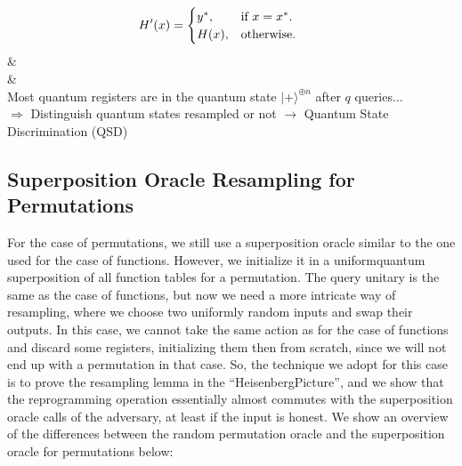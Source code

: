 \documentclass[12pt]{article}
\begin{document}
\begin{table}[htp]
{\begin{tblr}
                \vbox{
                    \vspace{-15ex}    
                    \begin{equation*}
                        \vspace{10ex}
                        \hspace{-5ex}
                        H'(x) = \begin{cases}
                            {y}^{*}, & \text{if $x = {x}^{*}$}.\\
                            H(x), & \text{otherwise}.
                        \end{cases}
                    \end{equation*}
                } & \\
                & \\
                Most quantum registers are in the quantum state ${|+\rangle}^{\oplus n}$ after $q$ queries... \\
                \color{red}$\Rightarrow$ Distinguish quantum states resampled or not $\rightarrow$ Quantum State\color{black}\\
                \phantom{..................................................................................}\color{red}Discrimination (QSD)\color{black}\\
            \end{tblr}
        }
        \label{tab:global-overview-main-differences-between-random-function-oracle-and-quantum-superposition-oracle}
        \caption{\centering Global Overview of the main differences between\break the Random Function Oracle and Quantum Superposition Oracle.}
    \end{table}

    
    \subsection{Superposition Oracle Resampling for Permutations}
    \label{subsec:superposition-oracle-resampling-permutations}

    For the case of permutations, we still use a superposition oracle similar to the one used for the case of functions. However, we initialize it in a uniform\break quantum superposition of all function tables for a permutation. The query unitary is the same as the case of functions, but now we need a more intricate way of resampling, where we choose two uniformly random inputs and swap their outputs. In this case, we cannot take the same action as for the case of functions and discard some registers, initializing them then from scratch, since we will not end up with a permutation in that case. So, the technique we adopt for this case is to prove the resampling lemma in the ``Heisenberg\break Picture'', and we show that the reprogramming operation essentially almost commutes with the superposition oracle calls of the adversary, at least if the input is honest. We show an overview of the differences between the random permutation oracle and the superposition oracle for permutations below:
    
\end{document}
